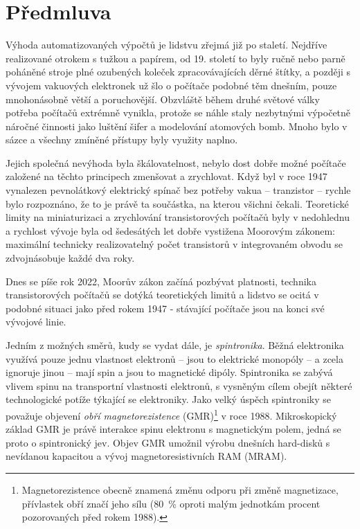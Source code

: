 \chapter*{Předmluva}
Výhoda automatizovaných výpočtů je lidstvu zřejmá již po staletí.
Nej\-dří\-ve realizované otrokem s tužkou a papírem, od 19. století to byly ručně nebo parně poháněné stroje plné ozubených koleček zpracovávajících děrné štítky, a později s vývojem vakuových elektronek už šlo o počítače podobné těm dnešním, pouze mnohonásobně větší a poruchovější.
Obzvláště během druhé světové války potřeba počítačů extrémně vynikla, protože se náhle staly nezbytnými výpočetně náročné činnosti jako luštění šifer a modelování atomových bomb.
Mnoho bylo v sázce a všechny zmíněné přístupy byly využity naplno.

Jejich společná nevýhoda byla škálovatelnost, nebylo dost dobře možné počítače založené na těchto principech zmenšovat a zrychlovat.
Když byl v roce 1947 vynalezen pevnolátkový elektrický spínač bez potřeby vakua -- tranzistor -- rychle bylo rozpoznáno, že to je právě ta součástka, na kterou všichni čekali.
Teoretické limity na miniaturizaci a zrychlování transistorových počítačů byly v nedohlednu a rychlost vývoje byla od šedesátých let dobře vystižena Moorovým zákonem: maximální technicky realizovatelný počet transistorů v integrovaném obvodu se zdvojnásobuje každé dva roky.

Dnes se píše rok 2022, Moorův zákon začíná pozbývat platnosti, technika transistorových počítačů se dotýká teoretických limitů a lidstvo se ocitá v podobné situaci jako před rokem 1947 - stávající počítače jsou na konci své vývojové linie.

Jedním z možných směrů, kudy se vydat dále, je \emph{spintronika}.
Běžná elektronika využívá pouze jednu vlastnost elektronů -- jsou to elektrické monopóly -- a zcela ignoruje jinou -- mají spin a jsou to magnetické dipóly.
Spintronika se zabývá vlivem spinu na transportní vlastnosti elektronů, s vysněným cílem obejít některé technologické potíže týkající se elektroniky.
Jako velký úspěch spintroniky se považuje objevení \emph{obří magnetorezistence} (GMR)\footnote{Magnetorezistence obecně znamená změnu odporu při změně magnetizace, přívlastek obří značí jeho sílu (\SI{80}{\percent} oproti malým jednotkám procent pozorovaných před rokem 1988).} v roce 1988.
Mikroskopický základ GMR je právě interakce spinu elektronu s magnetickým polem, jedná se proto o spintronický jev.
Objev GMR umožnil výrobu dnešních hard-disků s nevídanou kapacitou a vývoj magnetoresistivních RAM (MRAM).

